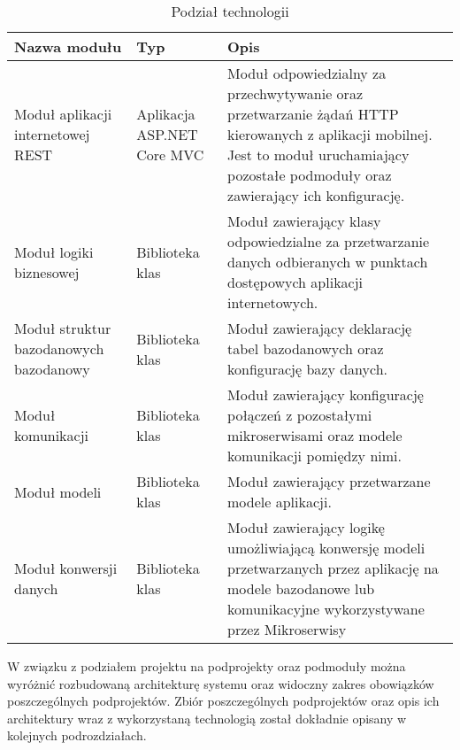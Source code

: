 {\begin{table}[htbp]
	\caption{Podział technologii}
	\label{project-architecture}
	\begin{center}
		\begin{tabular}{ | p{3cm}| p{3cm} | p{6cm} |}
			\hline Nazwa modułu & Typ &  Opis \\ \hline   
			
			\hline  Moduł aplikacji internetowej REST \cite{REST} &  Aplikacja ASP.NET Core MVC & Moduł odpowiedzialny za przechwytywanie oraz przetwarzanie żądań HTTP kierowanych z aplikacji mobilnej. Jest to moduł uruchamiający pozostałe podmoduły oraz zawierający ich konfigurację.\\ \hline
			
			\hline  Moduł logiki biznesowej & Biblioteka klas & Moduł zawierający klasy odpowiedzialne za przetwarzanie danych odbieranych w punktach dostępowych aplikacji internetowych. \\ \hline
			
			\hline Moduł struktur bazodanowych  \mbox{bazodanowy} & Biblioteka klas & Moduł zawierający deklarację tabel bazodanowych oraz konfigurację bazy danych.\\ \hline
			
			\hline Moduł komunikacji & Biblioteka klas & Moduł zawierający konfigurację połączeń z pozostałymi mikroserwisami oraz modele komunikacji pomiędzy nimi.\\ \hline
			
			\hline Moduł modeli & Biblioteka klas & Moduł zawierający przetwarzane modele aplikacji.\\ \hline
			
			
			\hline Moduł konwersji danych & Biblioteka klas & Moduł zawierający logikę umożliwiającą konwersję modeli przetwarzanych przez aplikację na modele bazodanowe lub komunikacyjne wykorzystywane przez Mikroserwisy\\ \hline

		\end{tabular}
	\end{center}
\end{table}	

W związku z podziałem projektu na podprojekty oraz podmoduły można wyróżnić rozbudowaną architekturę systemu oraz widoczny zakres obowiązków poszczególnych podprojektów. Zbiór poszczególnych podprojektów oraz opis ich architektury wraz z wykorzystaną technologią został dokładnie opisany w kolejnych podrozdziałach.}


